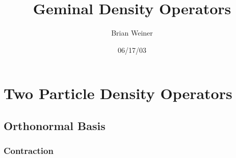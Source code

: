 \documentclass[aps,preprint]{revtex4}
\begin{document}
\preprint{}
\title[Geminal Density Operators]{Geminal Density Operators}
\author{Brian Weiner}
\date{06/17/03}
\maketitle
\tableofcontents

\section{Two Particle Density Operators\label{Two Particle}}

\subsection{Orthonormal Basis}

\subsubsection{Contraction}
\end{document}
